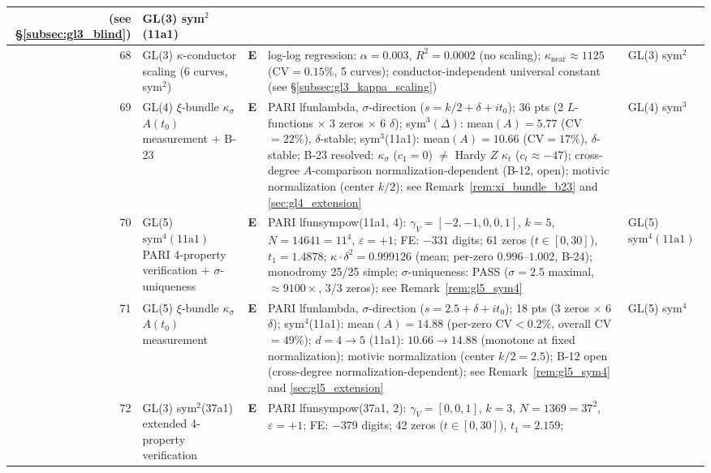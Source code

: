 \documentclass[11pt, a4paper]{article}
\theoremstyle{definition}
\theoremstyle{plain}
\begin{document}
\begin{center}
\begin{longtable}{@{}r l l p{4.2cm} l@{}}
   (see \S\ref{subsec:gl3_blind})
   & GL(3) sym$^2$(11a1) \\
\midrule
68 & GL(3) $\kappa$-conductor scaling (6 curves, sym$^2$) & \textbf{E} &
   log-log regression: $\alpha{=}0.003$, $R^2{=}0.0002$ (no scaling);
   $\kappa_{\mathrm{near}}{\approx}1125$ (CV${=}0.15\%$, 5 curves);
   conductor-independent universal constant
   (see \S\ref{subsec:gl3_kappa_scaling})
   & GL(3) sym$^2$ \\
\midrule
69 & GL(4) $\xi$-bundle $\kappa_\sigma$ $A(t_0)$ measurement $+$ B-23 & \textbf{E} &
   PARI lfunlambda, $\sigma$-direction ($s{=}k/2{+}\delta{+}it_0$);
   36 pts (2 $L$-functions ${\times}$ 3 zeros ${\times}$ 6 $\delta$);
   sym$^3(\Delta)$: mean$(A){=}5.77$ (CV${=}22\%$), $\delta$-stable;
   sym$^3$(11a1): mean$(A){=}10.66$ (CV${=}17\%$), $\delta$-stable;
   B-23 resolved: $\kappa_\sigma$ ($c_1{=}0$) $\neq$ Hardy $Z$ $\kappa_t$ ($c_t{\approx}{-}47$);
   cross-degree $A$-comparison normalization-dependent (B-12, open);
   motivic normalization (center $k/2$);
   see Remark~\ref{rem:xi_bundle_b23} and \cref{sec:gl4_extension}
   & GL(4) sym$^3$ \\
\midrule
70 & GL(5) $\mathrm{sym}^4(11\mathrm{a}1)$ PARI 4-property verification $+$ $\sigma$-uniqueness & \textbf{E} &
   PARI lfunsympow(11a1, 4): $\gamma_V{=}[-2,-1,0,0,1]$, $k{=}5$,
   $N{=}14641{=}11^4$, $\varepsilon{=}+1$;
   FE: $-331$ digits;
   61 zeros ($t{\in}[0,30]$), $t_1{=}1.4878$;
   $\kappa{\cdot}\delta^2{=}0.999126$ (mean; per-zero $0.996$--$1.002$, B-24);
   monodromy 25/25 simple;
   $\sigma$-uniqueness: PASS ($\sigma{=}2.5$ maximal, ${\approx}9100\times$, 3/3 zeros);
   see Remark~\ref{rem:gl5_sym4}
   & GL(5) $\mathrm{sym}^4(11\mathrm{a}1)$ \\
\midrule
71 & GL(5) $\xi$-bundle $\kappa_\sigma$ $A(t_0)$ measurement & \textbf{E} &
   PARI lfunlambda, $\sigma$-direction ($s{=}2.5{+}\delta{+}it_0$);
   18 pts (3 zeros ${\times}$ 6 $\delta$);
   sym$^4$(11a1): mean$(A){=}14.88$ (per-zero CV${<}0.2\%$, overall CV${=}49\%$);
   $d{=}4{\to}5$ (11a1): $10.66{\to}14.88$ (monotone at fixed normalization);
   motivic normalization (center $k/2{=}2.5$);
   B-12 open (cross-degree normalization-dependent);
   see Remark~\ref{rem:gl5_sym4} and \cref{sec:gl5_extension}
   & GL(5) sym$^4$ \\
\midrule
72 & GL(3) sym$^2$(37a1) extended 4-property verification & \textbf{E} &
   PARI lfunsympow(37a1, 2): $\gamma_V{=}[0,0,1]$, $k{=}3$,
   $N{=}1369{=}37^2$, $\varepsilon{=}+1$;
   FE: $-379$ digits;
   42 zeros ($t{\in}[0,30]$), $t_1{=}2.159$;

\end{longtable}
\end{center}
\end{document}
